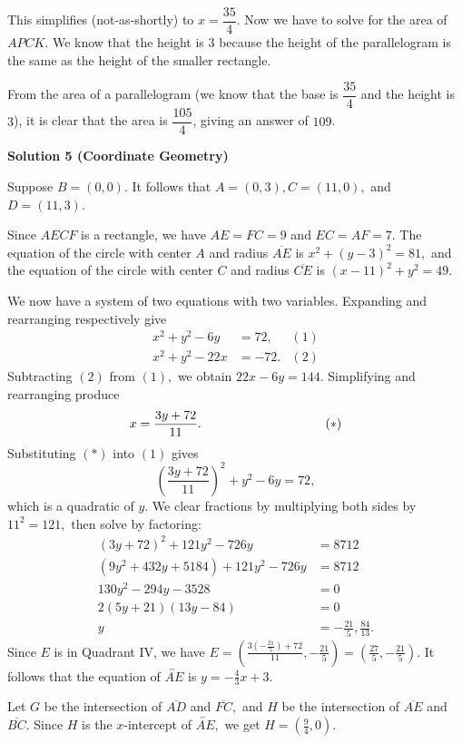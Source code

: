 \begin{enumerate}
 This simplifies (not-as-shortly) to $x = \dfrac{35}{4}$. Now we have to solve for the area of $APCK$. We know that the height is $3$ because the height of the parallelogram is the same as the height of the smaller rectangle.

 From the area of a parallelogram (we know that the base is $\dfrac{35}{4}$ and the height is $3$), it is clear that the area is $\dfrac{105}{4}$, giving an answer of $\boxed{109}$. 

 



\textbf{Solution 5 (Coordinate Geometry)}

Suppose $B=(0,0).$ It follows that $A=(0,3),C=(11,0),$ and $D=(11,3).$

 Since $AECF$ is a rectangle, we have $AE=FC=9$ and $EC=AF=7.$ The equation of the circle with center $A$ and radius $\overline{AE}$ is $x^2+(y-3)^2=81,$ and the equation of the circle with center $C$ and radius $\overline{CE}$ is $(x-11)^2+y^2=49.$

 We now have a system of two equations with two variables. Expanding and rearranging respectively give
 \begin{align*} x^2+y^2-6y&=72, &(1) \\ x^2+y^2-22x&=-72. &(2) \end{align*}
Subtracting $(2)$ from $(1),$ we obtain $22x-6y=144.$ Simplifying and rearranging produce 
 \[x=\frac{3y+72}{11}. \hspace{34.5mm} (*)\]Substituting $(*)$ into $(1)$ gives 
 \[\left(\frac{3y+72}{11}\right)^2+y^2-6y=72,\] which is a quadratic of $y.$ We clear fractions by multiplying both sides by $11^2=121,$ then solve by factoring:
 \begin{align*} \left(3y+72\right)^2+121y^2-726y&=8712 \\ \left(9y^2+432y+5184\right)+121y^2-726y&=8712 \\ 130y^2-294y-3528&=0 \\ 2(5y+21)(13y-84)&=0 \\ y&=-\frac{21}{5},\frac{84}{13}. \end{align*}
Since $E$ is in Quadrant IV, we have $E=\left(\frac{3\left(-\frac{21}{5}\right)+72}{11},-\frac{21}{5}\right)=\left(\frac{27}{5},-\frac{21}{5}\right).$ It follows that the equation of $\overleftrightarrow{AE}$ is $y=-\frac{4}{3}x+3.$ 

 Let $G$ be the intersection of $\overline{AD}$ and $\overline{FC},$ and $H$ be the intersection of $\overline{AE}$ and $\overline{BC}.$ Since $H$ is the $x$-intercept of $\overleftrightarrow{AE},$ we get $H=\left(\frac94,0\right).$


\end{enumerate}
